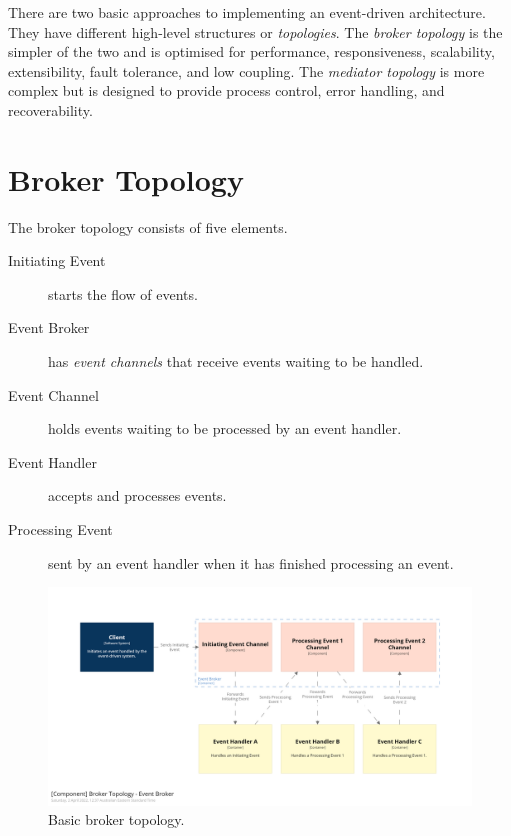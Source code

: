 There are two basic approaches to implementing an event-driven architecture.
They have different high-level structures or \emph{topologies}.
The \emph{broker topology} is the simpler of the two and is optimised for performance, responsiveness, scalability, extensibility, fault tolerance, and low coupling.
The \emph{mediator topology} is more complex but is designed to provide process control, error handling, and recoverability.


\section{Broker Topology}

The broker topology consists of five elements.

\begin{description}
    \item[Initiating Event] starts the flow of events.
    \item[Event Broker] has \emph{event channels} that receive events waiting to be handled.
    \item[Event Channel] holds events waiting to be processed by an event handler.
    \item[Event Handler] accepts and processes events.
    \item[Processing Event] sent by an event handler when it has finished processing an event.
\end{description}

\begin{figure}[h!]
    \begin{adjustwidth}{-10mm}{-10mm}
        \centering
        \includegraphics[trim=195 195 195 195,clip,width=0.97\paperwidth]{diagrams/broker-components.png}
    \end{adjustwidth}
    \caption{Basic broker topology.}
    \label{fig:broker-components}
\end{figure}

